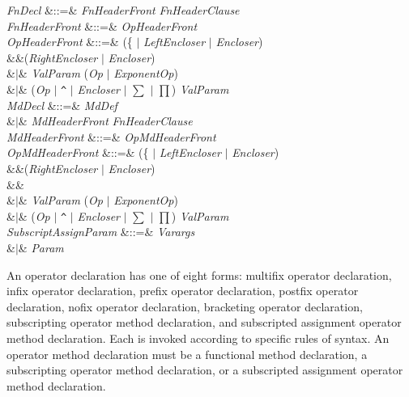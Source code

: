 \begin{Grammar}
\emph{FnDecl}
&::=&  \emph{FnHeaderFront} \emph{FnHeaderClause}
 \\

\emph{FnHeaderFront}  &::=& \emph{OpHeaderFront} \\

\emph{OpHeaderFront}
&::=&  
(\{\EXP{\mapsto} $|$ \emph{LeftEncloser} $|$ \emph{Encloser}) 
 \\
&&(\emph{RightEncloser} $|$ \emph{Encloser}) \\
&$|$&  \emph{ValParam}
(\emph{Op} $|$ \emph{ExponentOp})  \\
&$|$&  
(\emph{Op} $|$ \texttt{\^} $|$ \emph{Encloser} $|$ $\sum$ $|$ $\prod$)
  \emph{ValParam} \\

\emph{MdDecl} &::=& \emph{MdDef} \\
&$|$& 
 \emph{MdHeaderFront}
\emph{FnHeaderClause} \\

\emph{MdHeaderFront}  &::=& \emph{OpMdHeaderFront} \\

\emph{OpMdHeaderFront}
&::=&  
(\{\EXP{\mapsto} $|$ \emph{LeftEncloser} $|$ \emph{Encloser}) 
 \\
&&(\emph{RightEncloser} $|$ \emph{Encloser}) \\
&&
\\
&$|$&  \emph{ValParam}
(\emph{Op} $|$ \emph{ExponentOp})  \\
&$|$&  
(\emph{Op} $|$ \texttt{\^} $|$ \emph{Encloser} $|$ $\sum$ $|$ $\prod$)
  \emph{ValParam} \\

\emph{SubscriptAssignParam}
&::=& \emph{Varargs}\\
&$|$& \emph{Param}\\
\end{Grammar}

An operator declaration has one of eight
forms:
multifix operator declaration,
infix operator declaration,
prefix operator declaration, postfix operator declaration,
nofix operator declaration,
bracketing operator declaration,
subscripting operator method declaration,
and subscripted assignment operator method declaration.
Each is invoked according to specific rules of syntax.
An operator method declaration must be a functional method declaration,
a subscripting operator method declaration, or a subscripted assignment
operator method declaration.

